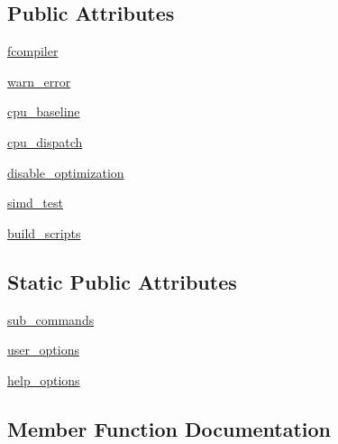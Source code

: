 \subsection*{Public Attributes}
\begin{DoxyCompactItemize}
\item 
\hyperlink{classnumpy_1_1distutils_1_1command_1_1build_1_1build_aa7cd52c273fce3b01f56ddca0d56518b}{fcompiler}
\item 
\hyperlink{classnumpy_1_1distutils_1_1command_1_1build_1_1build_a196cca2af6de5bd06747e942802749fb}{warn\+\_\+error}
\item 
\hyperlink{classnumpy_1_1distutils_1_1command_1_1build_1_1build_add936eb49b82687283f6e975e70ed2aa}{cpu\+\_\+baseline}
\item 
\hyperlink{classnumpy_1_1distutils_1_1command_1_1build_1_1build_a003d6ab2ce5c9b4079e1ed365fb9781c}{cpu\+\_\+dispatch}
\item 
\hyperlink{classnumpy_1_1distutils_1_1command_1_1build_1_1build_ae156804d100f4edbfc6e323667b18c44}{disable\+\_\+optimization}
\item 
\hyperlink{classnumpy_1_1distutils_1_1command_1_1build_1_1build_ae64895adeec22b74d7c422fdeb5df410}{simd\+\_\+test}
\item 
\hyperlink{classnumpy_1_1distutils_1_1command_1_1build_1_1build_a45b5f53541d3b87a7b876b0d84f51bc5}{build\+\_\+scripts}
\end{DoxyCompactItemize}
\subsection*{Static Public Attributes}
\begin{DoxyCompactItemize}
\item 
\hyperlink{classnumpy_1_1distutils_1_1command_1_1build_1_1build_ac075bf0a165ae91339767b6578e989b2}{sub\+\_\+commands}
\item 
\hyperlink{classnumpy_1_1distutils_1_1command_1_1build_1_1build_ab92e1503cbda6ed80b0af80e206bcb41}{user\+\_\+options}
\item 
\hyperlink{classnumpy_1_1distutils_1_1command_1_1build_1_1build_a5623d2263ad84e4a45c54ba8ab6eab6d}{help\+\_\+options}
\end{DoxyCompactItemize}


\subsection{Member Function Documentation}
\mbox{\label{classnumpy_1_1distutils_1_1command_1_1build_1_1build_a774225191d2038d9c06161f684f0a881}} 
